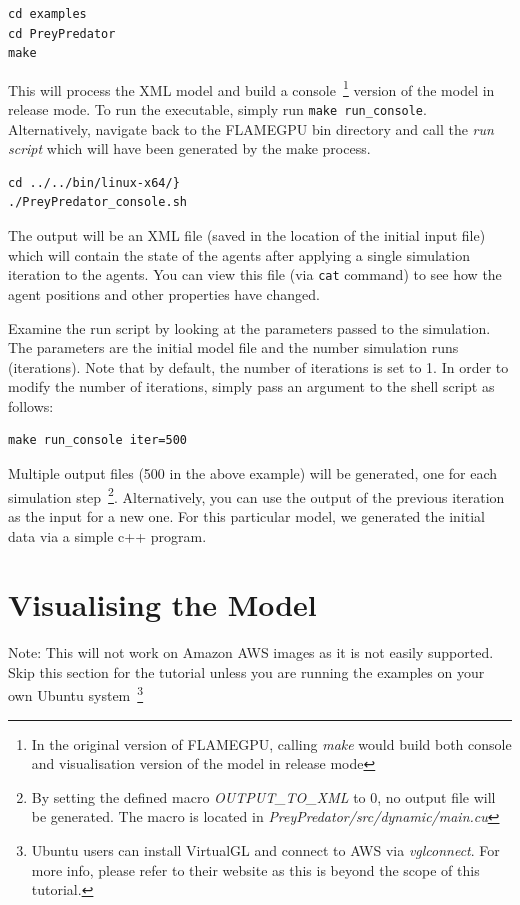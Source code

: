 \begin{verbatim}
cd examples
cd PreyPredator
make
\end{verbatim}


This will process the XML model and build a console~\footnote{In the original version of FLAMEGPU, calling \textit{make} would build both console and visualisation version of the model in release mode} version of the model in release mode. To run the executable, simply run \verb|make run_console|. Alternatively, navigate back to the FLAMEGPU bin directory and call the \textit{run script} which will have been generated by the make process.

\begin{verbatim}
cd ../../bin/linux-x64/}
./PreyPredator_console.sh
\end{verbatim}

The output will be an XML file (saved in the location of the initial input file) which will contain the state of the agents after applying a single simulation iteration to the agents. You can view this file (via \verb|cat| command) to see how the agent positions and other properties have changed. 


Examine the run script by looking at the parameters passed to the simulation. The parameters are the initial model file and the number simulation runs (iterations). Note that by default, the number of iterations is set to 1. In order to modify the number of iterations, simply pass an argument to the shell script as follows:

\begin{verbatim}
make run_console iter=500
\end{verbatim}

Multiple output files (500 in the above example) will be generated, one for each simulation step~\footnote{By setting the defined macro \textit{OUTPUT\_TO\_XML} to 0, no output file will be generated. The macro is located in \textit{PreyPredator/src/dynamic/main.cu}}. Alternatively, you can use the output of the previous iteration as the input for a new one. For this particular model, we generated the initial data via a simple c++ program. 

\section{Visualising the Model}
Note: This will not work on Amazon AWS images as it is not easily supported. Skip this section for the tutorial unless you are running the examples on your own Ubuntu system~\footnote{Ubuntu users can install VirtualGL and connect to AWS via \textit{vglconnect}. For more info, please refer to their website as this is beyond the scope of this tutorial.}


